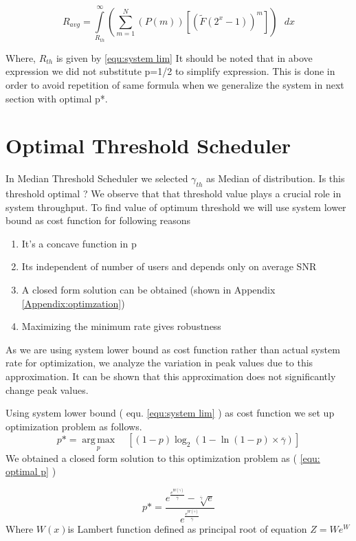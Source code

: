 \documentclass[conference]{IEEEtran}
\begin{document}
\[{{R}_{avg}}=\int\limits_{{{R}_{th}}}^{\infty }{\left( \sum\limits_{m=1}^{N}{\left( P(m) \right)\left[ {{\left( \widetilde F({{2}^{x}}-1) \right)}^{m}} \right]} \right)}\text{ }dx\]


Where, ${{R}_{th}}$ is given by \ref{equ:system lim}
It should be noted that in above expression we did not substitute p=1/2 to simplify expression. This is done in order to avoid repetition of same formula when we generalize the system in next section with optimal p*.\\


\section{Optimal Threshold Scheduler }


In Median Threshold Scheduler we selected ${{\gamma }_{th}}$ as Median of distribution. Is this threshold optimal ? We observe that that threshold value plays a crucial role in system throughput. To find value of optimum threshold we will use system lower bound as cost function for following reasons\\
\begin{enumerate}
\item It’s a concave function in p
\item Its independent of number of users and depends only on average SNR
\item A closed form solution can be obtained (shown in Appendix \ref{Appendix:optimzation})
\item Maximizing the minimum rate gives robustness 
\end{enumerate}

As we are using system lower bound as cost function rather than actual system rate for optimization, we  analyze the variation in peak values due to this approximation. It can be shown that this approximation does not significantly change peak values. 




Using system lower bound ( equ. \ref{equ:system lim} ) as  cost function we set up optimization problem as follows.   
\[p*=  \operatorname*{arg\,max}_p \quad [ \left( 1-p \right) {{\log }_{2}}\left( 1-\ln \left( 1-p \right)\times \overline{\gamma } \right)] \] 
We obtained a closed form solution to this optimization problem as  ( \ref{equ: optimal p} )

\[p*=\frac{{{e}^{\frac{{{e}^{W(\overline{\gamma })}}}{\overline{\gamma }}}}-\sqrt[\overline{\gamma }]{e}}{{{e}^{\frac{{{e}^{W(\overline{\gamma })}}}{\overline{\gamma }}}}}\]  
Where $W\left( x \right)$is Lambert function \cite{Lambert_W} defined as principal root of equation $Z=W{{e}^{W}}$  
\end{document}
